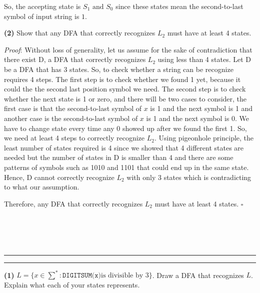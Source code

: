 \documentclass[a4paper, 11pt]{article}
\newcommand{\question}[2] {\vspace{.25in} \hrule\vspace{0.5em}
	\noindent{\bf #1: #2} \vspace{0.5em}
	\hrule \vspace{.10in}}
\renewcommand{\part}[1] {\vspace{.10in} {\bf (#1)}}
\begin{document}
	So, the accepting state is $S_1 \text{ and } S_0$ since these states mean the second-to-last symbol of input string is $1$.
	
	
	\part{2} Show that any DFA that correctly recognizes $L_2$ must have at least 4 states.
	
	{\em Proof}: Without loss of generality, let us assume for the sake of contradiction that there exist D, a DFA that correctly recognizes $L_2$ using less than 4 states. Let D be a DFA that has 3 states. So, to check whether a string can be recognize requires 4 steps. 
	The first step is to check whether we found 1 yet, because it could the the second last position symbol we need. 
	The second step is to check whether the next state is 1 or zero, and there will be two cases to consider, the first case is that the second-to-last symbol of $x$ is 1 and the next symbol is 1 and another case is the second-to-last symbol of $x$ is 1 and the next symbol is 0. We have to change state every time any 0 showed up after we found the first 1. So, we need at least 4 steps to correctly recognize $L_2$. Using pigeonhole principle, the least number of states required is 4 since we showed that 4 different states are needed but the number of states in D is smaller than 4 and there are some patterns of symbols such as 1010 and 1101 that could end up in the same state. Hence, D cannot correctly recognize $L_2$ with only 3 states which is contradicting to what our assumption.
	
	Therefore, any DFA that correctly recognizes $L_2$ must have at least 4 states. $\square$
	\\\\\\\\\\
	\question{7}{Digit Sum}
	\part{1} $L = \{x \in \sum^{*}: \texttt{DIGITSUM(x)} \text{is divisible by 3}\}$. Draw a DFA that recognizes $L$. Explain what each of your states represents.
	
\end{document}
